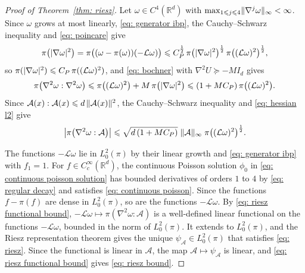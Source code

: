 \begin{proof}[Proof of Theorem~\ref{thm: riesz}]
    Let $\omega \in C^4(\mathbb R^d)$ with $\max_{1 \leqslant j \leqslant 4} \lVert \nabla^j \omega \rVert_\infty < \infty$. Since $\omega$ grows at most linearly, \eqref{eq: generator ibp}, the Cauchy--Schwarz inequality and \eqref{eq: poincare} give
    \begin{equation*}
        \pi\bigl( |\nabla \omega|^2 \bigr) = \pi\bigl( (\omega - \pi(\omega)) (-\mathcal L \omega) \bigr) \leqslant C_P^{\frac12}\, \pi\bigl( |\nabla \omega|^2 \bigr)^{\frac12}\, \pi\bigl( (\mathcal L \omega)^2 \bigr)^{\frac12} ,
    \end{equation*}
    so $\pi(|\nabla \omega|^2) \leqslant C_P\, \pi((\mathcal L \omega)^2)$, and \eqref{eq: bochner} with $\nabla^2 U \succeq -M I_d$ gives
    \begin{equation}
        \pi\bigl( \nabla^2 \omega : \nabla^2 \omega \bigr) \leqslant \pi\bigl( (\mathcal L \omega)^2 \bigr) + M\, \pi\bigl( |\nabla \omega|^2 \bigr) \leqslant (1 + M C_P)\, \pi\bigl( (\mathcal L \omega)^2 \bigr) .
        \label{eq: hessian l2}
    \end{equation}
    Since $\mathcal A(x) : \mathcal A(x) \leqslant d\, \lVert \mathcal A(x) \rVert^2$, the Cauchy--Schwarz inequality and \eqref{eq: hessian l2} give
    \begin{equation}
        \bigl| \pi\bigl( \nabla^2 \omega : \mathcal A \bigr) \bigr| \leqslant \sqrt{d\, (1 + M C_P)}\; \lVert \mathcal A \rVert_\infty\; \pi\bigl( (\mathcal L \omega)^2 \bigr)^{\frac12} .
        \label{eq: riesz functional bound}
    \end{equation}

    The functions $-\mathcal L \omega$ lie in $L^2_0(\pi)$ by their linear growth and \eqref{eq: generator ibp} with $f_1 = 1$. For $f \in C_c^\infty(\mathbb R^d)$, the continuous Poisson solution $\phi_0$ in \eqref{eq: continuous poisson solution} has bounded derivatives of orders $1$ to $4$ by \eqref{eq: regular decay} and satisfies \eqref{eq: continuous poisson}. Since the functions $f - \pi(f)$ are dense in $L^2_0(\pi)$, so are the functions $-\mathcal L \omega$. By \eqref{eq: riesz functional bound}, $-\mathcal L \omega \mapsto \pi(\nabla^2 \omega : \mathcal A)$ is a well-defined linear functional on the functions $-\mathcal L \omega$, bounded in the norm of $L^2_0(\pi)$. It extends to $L^2_0(\pi)$, and the Riesz representation theorem gives the unique $\psi_{\mathcal A} \in L^2_0(\pi)$ that satisfies \eqref{eq: riesz}. Since the functional is linear in $\mathcal A$, the map $\mathcal A \mapsto \psi_{\mathcal A}$ is linear, and \eqref{eq: riesz functional bound} gives \eqref{eq: riesz bound}.
\end{proof}

